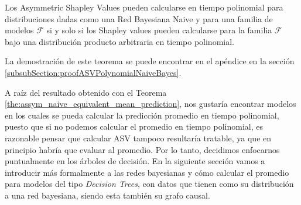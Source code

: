 
\begin{theorem}\label{the:assym_naive_equivalent_mean_prediction}
	Los Asymmetric Shapley Values pueden calcularse en tiempo polinomial para distribuciones dadas como una Red Bayesiana Naive y para una familia de modelos \(\mathcal{F}\) si y solo si los Shapley values pueden calcularse para la familia \(\mathcal{F}\) bajo una distribución producto arbitraria en tiempo polinomial.
\end{theorem}

La demostración de este teorema se puede encontrar en el apéndice en la sección \ref{subsubSection:proofASVPolynomialNaiveBayes}.

A raíz del resultado obtenido con el Teorema \ref{the:assym_naive_equivalent_mean_prediction}, nos gustaría encontrar modelos en los cuales se pueda calcular la predicción promedio en tiempo polinomial, puesto que si no podemos calcular el promedio en tiempo polinomial, es razonable pensar que calcular ASV tampoco resultaría tratable, ya que en principio habría que evaluar al promedio. Por lo tanto, decidimos enfocarnos puntualmente en los árboles de decisión. En la siguiente sección vamos a introducir más formalmente a las redes bayesianas y cómo calcular el promedio para modelos del tipo \emph{Decision Trees}, con datos que tienen como su distribución a una red bayesiana, siendo esta también su grafo causal. 

